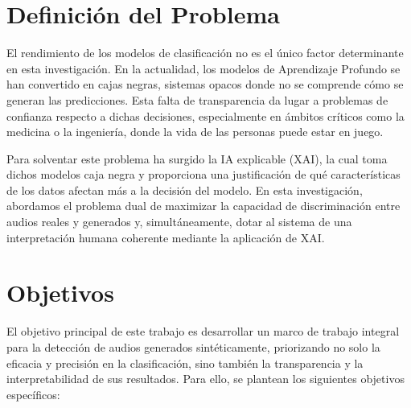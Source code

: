 \section{Definición del Problema}
El rendimiento de los modelos de clasificación no es el único factor determinante en esta investigación. En la actualidad, los modelos de Aprendizaje Profundo se han convertido en cajas negras, sistemas opacos donde no se comprende cómo se generan las predicciones. Esta falta de transparencia da lugar a problemas de confianza respecto a dichas decisiones, especialmente en ámbitos críticos como la medicina o la ingeniería, donde la vida de las personas puede estar en juego.

Para solventar este problema ha surgido la IA explicable (XAI), la cual toma dichos modelos caja negra y proporciona una justificación de qué características de los datos afectan más a la decisión del modelo. En esta investigación, abordamos el problema dual de maximizar la capacidad de discriminación entre audios reales y generados y, simultáneamente, dotar al sistema de una interpretación humana coherente mediante la aplicación de XAI.

\section{Objetivos}
El objetivo principal de este trabajo es desarrollar un marco de trabajo integral para la detección de audios generados sintéticamente, priorizando no solo la eficacia y precisión en la clasificación, sino también la transparencia y la interpretabilidad de sus resultados. Para ello, se plantean los siguientes objetivos específicos:

